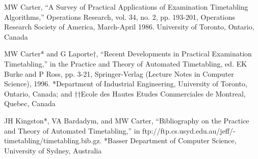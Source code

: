 \begin{thebibliography}{99}
 MW Carter, “A Survey of Practical Applications of Examination Timetabling Algorithms,”
Operations Research, vol. 34, no. 2, pp. 193-201, Operations Research Society
of America, March-April 1986. University of Toronto, Ontario, Canada

 MW Carter* and G Laporte†, “Recent Developments in Practical Examination Timetabling,”
in the Practice and Theory of Automated Timetabling, ed. EK Burke and P
Ross, pp. 3-21, Springer-Verlag (Lecture Notes in Computer Science), 1996.
*Department of Industrial Engineering, University of Toronto, Ontario, Canada;
and ††Ecole des Hautes Etudes Commerciales de Montreal, Quebec, Canada

 JH Kingston*, VA Bardadym, and MW Carter, “Bibliography on the Practice and
Theory of Automated Timetabling,” in ftp://ftp.cs.usyd.edu.au/jeff/-
timetabling/timetabling.bib.gz. *Basser Department of Computer Science,
University of Sydney, Australia

\end{thebibliography}